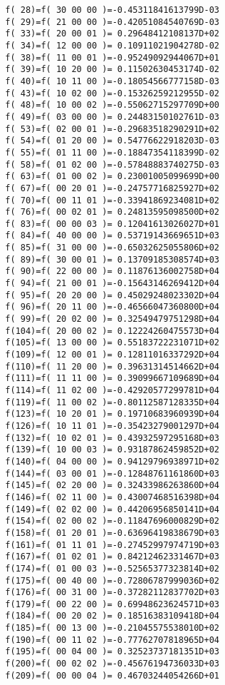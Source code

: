 {\begin{verbatim}
  f( 28)=f( 30 00 00 )=-0.45311841613799D-03
  f( 29)=f( 21 00 00 )=-0.42051084540769D-03
  f( 33)=f( 20 00 01 )= 0.29648412108137D+02
  f( 34)=f( 12 00 00 )= 0.10911021904278D-02
  f( 38)=f( 11 00 01 )=-0.95249092944067D+01
  f( 39)=f( 10 20 00 )= 0.11502630453174D-02
  f( 40)=f( 10 11 00 )=-0.18054566777158D-03
  f( 43)=f( 10 02 00 )=-0.15326259212955D-02
  f( 48)=f( 10 00 02 )=-0.55062715297709D+00
  f( 49)=f( 03 00 00 )= 0.24483150102761D-03
  f( 53)=f( 02 00 01 )=-0.29683518290291D+02
  f( 54)=f( 01 20 00 )= 0.54776622918203D-03
  f( 55)=f( 01 11 00 )=-0.18847354118399D-02
  f( 58)=f( 01 02 00 )=-0.57848883740275D-03
  f( 63)=f( 01 00 02 )= 0.23001005099699D+00
  f( 67)=f( 00 20 01 )=-0.24757716825927D+02
  f( 70)=f( 00 11 01 )=-0.33941869234081D+02
  f( 76)=f( 00 02 01 )= 0.24813595098500D+02
  f( 83)=f( 00 00 03 )= 0.12041613026027D+01
  f( 84)=f( 40 00 00 )= 0.53719143669651D+03
  f( 85)=f( 31 00 00 )=-0.65032625055806D+02
  f( 89)=f( 30 00 01 )= 0.13709185308574D+03
  f( 90)=f( 22 00 00 )= 0.11876136002758D+04
  f( 94)=f( 21 00 01 )=-0.15643146269412D+04
  f( 95)=f( 20 20 00 )= 0.45029248023302D+04
  f( 96)=f( 20 11 00 )=-0.46566047360800D+04
  f( 99)=f( 20 02 00 )= 0.32549479751298D+04
  f(104)=f( 20 00 02 )= 0.12224260475573D+04
  f(105)=f( 13 00 00 )= 0.55183722231071D+02
  f(109)=f( 12 00 01 )= 0.12811016337292D+04
  f(110)=f( 11 20 00 )= 0.39631314514662D+04
  f(111)=f( 11 11 00 )= 0.39099667109689D+04
  f(114)=f( 11 02 00 )=-0.42920577299781D+04
  f(119)=f( 11 00 02 )=-0.80112587128335D+04
  f(123)=f( 10 20 01 )= 0.19710683960939D+04
  f(126)=f( 10 11 01 )=-0.35423279001297D+04
  f(132)=f( 10 02 01 )= 0.43932597295168D+03
  f(139)=f( 10 00 03 )= 0.93187862459852D+02
  f(140)=f( 04 00 00 )= 0.94129796938971D+02
  f(144)=f( 03 00 01 )=-0.12848761161860D+03
  f(145)=f( 02 20 00 )= 0.32433986263860D+04
  f(146)=f( 02 11 00 )= 0.43007468516398D+04
  f(149)=f( 02 02 00 )= 0.44206956850141D+04
  f(154)=f( 02 00 02 )=-0.11847696000829D+02
  f(158)=f( 01 20 01 )=-0.63696419838679D+03
  f(161)=f( 01 11 01 )=-0.27452997974719D+03
  f(167)=f( 01 02 01 )= 0.84212462331467D+03
  f(174)=f( 01 00 03 )=-0.52565377323814D+02
  f(175)=f( 00 40 00 )=-0.72806787999036D+02
  f(176)=f( 00 31 00 )=-0.37282112837702D+03
  f(179)=f( 00 22 00 )= 0.69948623624571D+03
  f(184)=f( 00 20 02 )= 0.18516383109418D+04
  f(185)=f( 00 13 00 )=-0.21045575538010D+02
  f(190)=f( 00 11 02 )=-0.77762707818965D+04
  f(195)=f( 00 04 00 )= 0.32523737181351D+03
  f(200)=f( 00 02 02 )=-0.45676194736033D+03
  f(209)=f( 00 00 04 )= 0.46703244054266D+01


\end{verbatim}}
